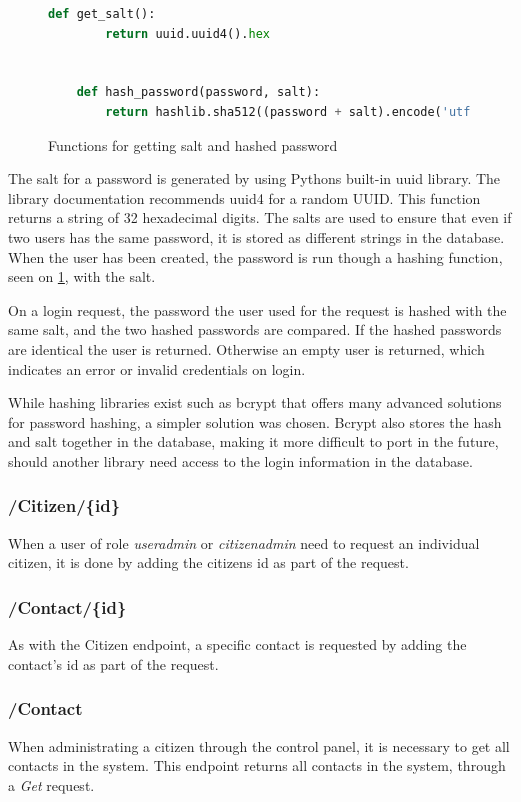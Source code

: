 \begin{figure}[H]
    \centering
    \begin{lstlisting}[language=Python]
    def get_salt():
        return uuid.uuid4().hex


    def hash_password(password, salt):
        return hashlib.sha512((password + salt).encode('utf-8')).hexdigest()
    \end{lstlisting}
    \caption{Functions for getting salt and hashed password}
    \label{fig:passwordhashing}
\end{figure}

The salt for a password is generated by using Pythons built-in uuid library\cite{Python:UUID}. The library documentation recommends uuid4 for a random UUID. This function returns a string of 32 hexadecimal digits. The salts are used to ensure that even if two users has the same password, it is stored as different strings in the database. When the user has been created, the password is run though a hashing function, seen on \ref{fig:passwordhashing}, with the salt.

On a login request, the password the user used for the request is hashed with the same salt, and the two hashed passwords are compared. If the hashed passwords are identical the user is returned. Otherwise an empty user is returned, which indicates an error or invalid credentials on login.

While hashing libraries exist such as bcrypt \cite{bcrypt} that offers many advanced solutions for password hashing, a simpler solution was chosen. Bcrypt also stores the hash and salt together in the database, making it more difficult to port in the future, should another library need access to the login information in the database.

\subsubsection{/Citizen/\{id\}}
When a user of role \textit{useradmin} or \textit{citizenadmin} need to request an individual citizen, it is done by adding the citizens id as part of the request.

\subsubsection{/Contact/\{id\}}
As with the Citizen endpoint, a specific contact is requested by adding the contact's id as part of the request.

\subsubsection{/Contact}
When administrating a citizen through the control panel, it is necessary to get all contacts in the system. This endpoint returns all contacts in the system, through a \textit{Get} request.

